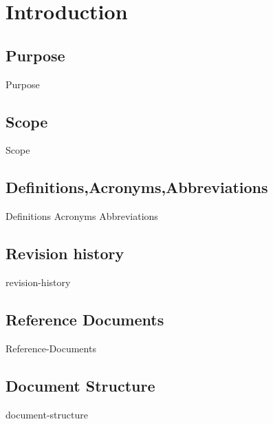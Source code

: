 \section{Introduction}

\subsection{Purpose}
{Purpose}

\subsection{Scope}
{Scope}

\subsection{Definitions,Acronyms,Abbreviations}
{Definitions}
{Acronyms}
{Abbreviations}


\subsection{Revision history}
{revision-history}

\subsection{Reference Documents}
{Reference-Documents}

\subsection{Document Structure}
{document-structure}
